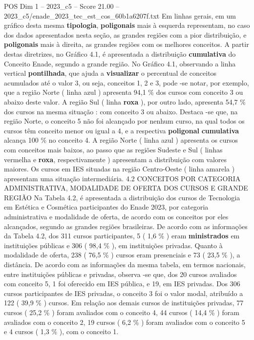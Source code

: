 \begin{textsample}{POS Dim 1 – 2023\_c5 – Score 21.00 – 2023\_c5/enade\_2023\_tec\_est\_cos\_60b1a6207f.txt}
Em linhas gerais, em um gráfico desta mesma \textbf{tipologia}, \textbf{poligonais} mais à esquerda representam, no caso dos dados apresentados nesta seção, as grandes regiões com a pior distribuição, e \textbf{poligonais} mais à direita, as grandes regiões com os melhores conceitos.
A partir destas diretrizes, no Gráfico 4.1, é apresentada a distribuição \textbf{cumulativa} do Conceito Enade, segundo a grande região.
No Gráfico 4.1, observando a linha vertical \textbf{pontilhada}, que ajuda a \textbf{visualizar} o percentual de conceitos acumulados até o valor 3, ou seja, conceitos 1, 2 e 3, pode -se notar, por exemplo, que a região Norte ( linha azul ) apresenta 94,1 \% dos cursos com conceito 3 ou abaixo deste valor.
A região Sul ( linha \textbf{roxa} ), por outro lado, apresenta 54,7 \% dos cursos na mesma situação : com conceito 3 ou abaixo.
Destaca -se que, na região Norte, o conceito 5 não foi alcançado por nenhum curso, na qual todos os cursos têm conceito menor ou igual a 4, e a respectiva \textbf{poligonal} \textbf{cumulativa} alcança 100 \% no conceito 4.
A região Norte ( linha azul ) apresenta os cursos com conceitos mais baixos, ao passo que as regiões Sudeste e Sul ( linhas vermelha e \textbf{roxa}, respectivamente ) apresentam a distribuição com valores maiores.
Os cursos em IES situadas na região Centro-Oeste ( linha amarela ) apresentam uma situação intermediária. 4.2 CONCEITOS POR CATEGORIA ADMINISTRATIVA, MODALIDADE DE OFERTA DOS CURSOS E GRANDE REGIÃO Na Tabela 4.2, é apresentada a distribuição dos cursos de Tecnologia em Estética e Cosmética participantes do Enade 2023, por categoria administrativa e modalidade de oferta, de acordo com os conceitos por eles alcançados, segundo as grandes regiões brasileiras.
De acordo com as informações da Tabela 4.2, dos 311 cursos participantes, 5 ( 1,6 \% ) eram \textbf{ministrados} em instituições públicas e 306 ( 98,4 \% ), em instituições privadas.
Quanto à modalidade de oferta, 238 ( 76,5 \% ) cursos eram presenciais e 73 ( 23,5 \% ), a distância.
De acordo com as informações da mesma tabela, em termos nacionais, entre instituições públicas e privadas, observa -se que, dos 20 cursos avaliados com conceito 5, 1 foi oferecido em IES pública, e 19, em IES privadas.
Dos 306 cursos participantes de IES privadas, o conceito 3 foi o valor modal, atribuído a 122 ( 39,9 \% ) cursos.
Em relação aos demais cursos de instituições privadas, 77 cursos ( 25,2 \% ) foram avaliados com o conceito 4, 44 cursos ( 14,4 \% ) foram avaliados com o conceito 2, 19 cursos ( 6,2 \% ) foram avaliados com o conceito 5 e 4 cursos ( 1,3 \% ), com o conceito 1.

\end{textsample}
